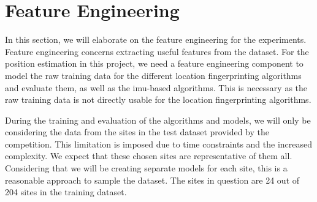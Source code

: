 \section{Feature Engineering}\label{sec:feature_eng}
In this section, we will elaborate on the feature engineering for the experiments. Feature engineering concerns extracting useful features from the dataset.  %
For the position estimation in this project, we need a feature engineering component to model the raw training data for the different location fingerprinting algorithms and evaluate them, as well as the \gls{imu}-based algorithms. This is necessary as the raw training data is not directly usable for the location fingerprinting algorithms. %

During the training and evaluation of the algorithms and models, we will only be considering the data from the sites in the test dataset provided by the competition. This limitation is imposed due to time constraints and the increased complexity. We expect that these chosen sites are representative of them all. Considering that we will be creating separate models for each site, this is a reasonable approach to sample the dataset. The sites in question are 24 out of 204 sites in the training dataset.

